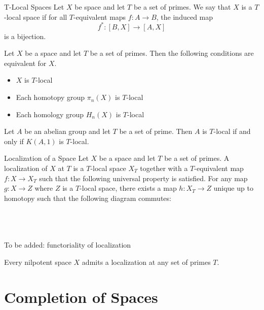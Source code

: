 \documentclass[a4paper]{article}
\begin{document}
\begin{defn}{T-Local Spaces}{} Let $X$ be space and let $T$ be a set of primes. We say that $X$ is a $T$-local space if for all $T$-equivalent maps $f:A\to B$, the induced map $$f^\ast:[B,X]\to[A,X]$$ is a bijection. 
\end{defn}

\begin{thm}{}{} Let $X$ be a space and let $T$ be a set of primes. Then the following conditions are equivalent for $X$. 
\begin{itemize}
\item $X$ is $T$-local
\item Each homotopy group $\pi_n(X)$ is $T$-local
\item Each homology group $H_n(X)$ is $T$-local
\end{itemize}
\end{thm}

\begin{prp}{}{} Let $A$ be an abelian group and let $T$ be a set of prime. Then $A$ is $T$-local if and only if $K(A,1)$ is $T$-local. 
\end{prp}

\begin{defn}{Localization of a Space}{} Let $X$ be a space and let $T$ be a set of primes. A localization of $X$ at $T$ is a $T$-local space $X_T$ together with a $T$-equivalent map $f:X\to X_T$ such that the following universal property is satisfied. For any map $g:X\to Z$ where $Z$ is a $T$-local space, there exists a map $h:X_T\to Z$ unique up to homotopy such that the following diagram commutes: \\~\\
\\~\\
\end{defn}

To be added: functoriality of localization

\begin{thm}{}{} Every nilpotent space $X$ admits a localization at any set of primes $T$. 
\end{thm}

\pagebreak
\section{Completion of Spaces}
\end{document}
